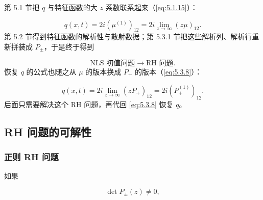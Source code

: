 \documentclass[
    lang=cn,
    scheme=chinese,
    mode=simple,
    device=normal,
    color=blue,
    math=cm,
    thmcnt=section,
    12pt
]{elegantbook}
\begin{document}



\begin{callout}[到这里发生了什么？]
    第 5.1 节把 $q$ 与特征函数的大 $z$ 系数联系起来（\eqref{eq:5.1.15}）：

    \[
        q(x,t)=2i(\mu^{(1)})_{12}=2i\lim\limits_{z\to\infty}(z\mu)_{12}.
    \]
    第 5.2 节得到特征函数的解析性与散射数据；第 5.3.1 节把这些解析列、解析行重新拼装成 $P_\pm$，于是终于得到

    \[
        \boxed{\text{NLS 初值问题}\longrightarrow\text{RH 问题}.}
    \]
    恢复 $q$ 的公式也随之从 $\mu$ 的版本换成 $P_+$ 的版本（\eqref{eq:5.3.8}）：

    \[
        q(x,t)=2i\lim\limits_{z\to\infty}(zP_+)_{12}=2i(P_+^{(1)})_{12}.
    \]
    后面只需要解决这个 RH 问题，再代回 \eqref{eq:5.3.8} 恢复 $q$。
    
\end{callout}

\subsection{RH 问题的可解性}

\subsubsection{正则 RH 问题}

如果

\begin{equation}
    \det P_\pm(z)\ne0,
    \tag{5.3.10}
    \label{eq:5.3.10}
\end{equation}
\end{document}
